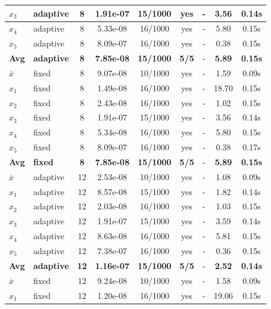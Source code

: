 \begin{longtable}{|l|l|c|c|c|c|c|c|c|}
\hline
$x_3$ & adaptive & 8 & 1.91e-07 & 15/1000 & yes & - & 3.56 & 0.14s \\
\hline
$x_4$ & adaptive & 8 & 5.33e-08 & 16/1000 & yes & - & 5.80 & 0.15s \\
\hline
$x_5$ & adaptive & 8 & 8.09e-07 & 16/1000 & yes & - & 0.38 & 0.15s \\
\hline
\hline\hline
\textbf{Avg} & \textbf{adaptive} & \textbf{8} & \textbf{7.85e-08} & \textbf{15/1000} & \textbf{5/5} & - & \textbf{5.89} & \textbf{0.15s} \\
\hline\hline
\hline
$\bar{x}$ & fixed & 8 & 9.07e-08 & 10/1000 & yes & - & 1.59 & 0.09s \\
\hline
$x_1$ & fixed & 8 & 1.49e-08 & 16/1000 & yes & - & 18.70 & 0.15s \\
\hline
$x_2$ & fixed & 8 & 2.43e-08 & 16/1000 & yes & - & 1.02 & 0.15s \\
\hline
$x_3$ & fixed & 8 & 1.91e-07 & 15/1000 & yes & - & 3.56 & 0.14s \\
\hline
$x_4$ & fixed & 8 & 5.34e-08 & 16/1000 & yes & - & 5.80 & 0.15s \\
\hline
$x_5$ & fixed & 8 & 8.09e-07 & 16/1000 & yes & - & 0.38 & 0.17s \\
\hline
\hline\hline
\textbf{Avg} & \textbf{fixed} & \textbf{8} & \textbf{7.85e-08} & \textbf{15/1000} & \textbf{5/5} & - & \textbf{5.89} & \textbf{0.15s} \\
\hline\hline
$\bar{x}$ & adaptive & 12 & 2.53e-08 & 10/1000 & yes & - & 1.08 & 0.09s \\
\hline
$x_1$ & adaptive & 12 & 8.57e-08 & 15/1000 & yes & - & 1.82 & 0.14s \\
\hline
$x_2$ & adaptive & 12 & 2.03e-08 & 16/1000 & yes & - & 1.03 & 0.15s \\
\hline
$x_3$ & adaptive & 12 & 1.91e-07 & 15/1000 & yes & - & 3.59 & 0.14s \\
\hline
$x_4$ & adaptive & 12 & 8.63e-08 & 16/1000 & yes & - & 5.81 & 0.15s \\
\hline
$x_5$ & adaptive & 12 & 7.38e-07 & 16/1000 & yes & - & 0.36 & 0.15s \\
\hline
\hline\hline
\textbf{Avg} & \textbf{adaptive} & \textbf{12} & \textbf{1.16e-07} & \textbf{15/1000} & \textbf{5/5} & - & \textbf{2.52} & \textbf{0.14s} \\
\hline\hline
\hline
$\bar{x}$ & fixed & 12 & 9.24e-08 & 10/1000 & yes & - & 1.58 & 0.09s \\
\hline
$x_1$ & fixed & 12 & 1.20e-08 & 16/1000 & yes & - & 19.06 & 0.15s \\

\end{longtable}
